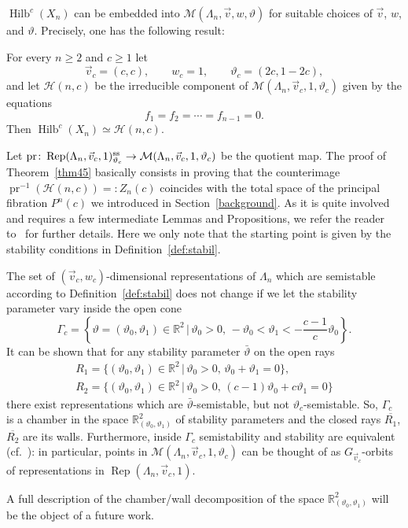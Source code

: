 $\operatorname{Hilb}^c (X_n)$ can be embedded into $\mathcal{M} (\Lambda_n,\vec{v},w, \vartheta)$
for suitable choices of $\vec{v}$, $w$, and $\vartheta$. Precisely, one has the following result:
\begin{Theorem}\label{thm45}
For every $n\geq 2$ and $c\geq 1$ let
\[\vec{v}_c=(c,c) ,\qquad w_c = 1 ,\qquad \vartheta_c = (2c, 1-2c ),\]
and let
$\mathcal{H} (n,c) $ be the irreducible component of $\mathcal{M}(\Lambda_n,\vec{v}_c, 1, \vartheta_c) $
given by the equations
\begin{equation}\label{sliceeqs}
f_1 = f_2 = \cdots = f_{n-1} =0 .
\end{equation}
Then $\operatorname{Hilb}^c (X_n)\simeq \mathcal{H} (n,c) $.
\end{Theorem}
Let $\mbox{pr}\colon \operatorname{Rep}(\Lambda_n, \vec{v}_c, 1)^{\rm ss}_{\vartheta_c} \to \mathcal{M} (\Lambda_n,\vec{v}_c,1, \vartheta_c) $
be the quotient map. The proof {of Theorem~\ref{thm45} basically consists in proving that the counterimage
$\operatorname{pr}^{-1}(\mathcal{H} (n,c) )=:Z_n(c)$ coincides with the total space of the principal fibration $P^n(c)$ we introduced in Section~\ref{background}. As it is quite involved and requires a few intermediate Lemmas and Propositions, we refer the reader to~\cite{bblr} for further details.} Here we only note that the starting point is given by the stability conditions in Definition~\ref{def:stabil}.

\begin{Remark}The set of $(\vec{v}_c,w_c)$-dimensional representations of $\Lambda_n$ which are semistable according to Definition~\ref{def:stabil} does not change if we let the stability parameter vary inside the open cone
\[
 \Gamma_c=\left\{\vartheta=(\vartheta_0,\vartheta_1)\in\mathbb{R}^2\,|\,\vartheta_0>0,\, -\vartheta_0<\vartheta_1<-\frac{c-1}{c}\vartheta_0\right\} .
\]
It can be shown that
for any stability parameter $\bar{\vartheta}$ on the open rays
\begin{gather*}
 R_1 = \big\{(\vartheta_0,\vartheta_1)\in\mathbb{R}^2\,|\,\vartheta_0>0 ,\, \vartheta_0+\vartheta_1=0\big\} ,\\
 R_2 = \big\{(\vartheta_0,\vartheta_1)\in\mathbb{R}^2\,|\,\vartheta_0>0 ,\, (c-1)\vartheta_0+c\vartheta_1=0\big\}
\end{gather*}
there exist representations which are $\bar{\vartheta}$-semistable, but not $\vartheta_c$-semistable.
So, $ \Gamma_c$ is a chamber in the space
$\mathbb{R}^2_{(\vartheta_0,\vartheta_1)}$ of stability parameters and the closed rays $\overline{R_1}$, $\overline{R_2}$ are its walls. Furthermore, inside $\Gamma_c$ semistability and stability are equivalent (cf.~\cite[Lemma~4.7]{bblr}): in particular, points in $\mathcal{M} (\Lambda_n,\vec{v}_c,1, \vartheta_c)$ can be thought of as
$G_{\vec{v}_c}$-orbits of representations in $\operatorname{Rep}(\Lambda_n, \vec{v}_c, 1)$.

A full description of the chamber/wall decomposition of the space $\mathbb{R}^2_{(\vartheta_0,\vartheta_1)}$ will be the object of a future work.
\end{Remark}


